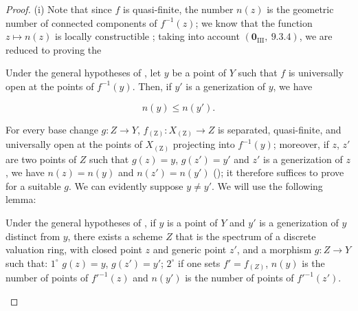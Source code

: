 \begin{proof}
(i)
Note that since $f$ is quasi-finite, the number $n(z)$ is the geometric number of connected components of $f^{-1}(z)$; we know that the function $z\mapsto n(z)$ is locally constructible ; taking into account $(\mathbf{0}_{\mathrm{III}},~9.3.4)$, we are reduced to proving the

\begin{corollary}[15.5.2]
\label{IV.15.5.2}
Under the general hypotheses of , let $y$ be a point of $Y$ such that $f$ is universally open at the points of $f^{-1}(y)$.
Then, if $y'$ is a generization of $y$, we have
\end{corollary}

\begin{equation}
\tag{15.5.2.1}
\label{IV.15.5.2.1}
  n(y) \leq n(y').
\end{equation}

For every base change $g:Z\to Y$, $f_{(\mathrm{Z})}:X_{(\mathrm{Z})}\to Z$ is separated, quasi-finite, and universally open at the points of $X_{(\mathrm{Z})}$ projecting into $f^{-1}(y)$; moreover, if $z$, $z'$ are two points of $Z$ such that $g(z)=y$, $g(z')=y'$ and $z'$ is a generization of $z$, we have $n(z)=n(y)$ and $n(z')=n(y')$ (); it therefore suffices to prove  for a suitable $g$.
We can evidently suppose $y\neq y'$.
We will use the following lemma:

\begin{lemma}[15.5.2.2]
\label{IV.15.5.2.2}
Under the general hypotheses of , if $y$ is a point of $Y$ and $y'$ is a generization of $y$ distinct from $y$, there exists a scheme $Z$ that is the spectrum of a discrete valuation ring, with closed point $z$ and generic point $z'$, and a morphism $g:Z\to Y$ such that:
$1^\circ$ $g(z)=y$, $g(z')=y'$;
$2^\circ$ if one sets $f'=f_{(Z)}$, $n(y)$ is the number of points of $f'^{-1}(z)$ and $n(y')$ is the number of points of $f'^{-1}(z')$.
\end{lemma}


\end{proof}
